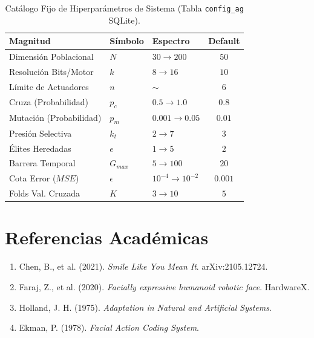 \documentclass[11pt, a4paper]{article}
\begin{document}
\begin{table}[H]
    \centering
    \caption{Catálogo Fijo de Hiperparámetros de Sistema (Tabla \texttt{config\_ag} SQLite).}
    \small
    \begin{tabular}{@{}lllc@{}}
        \toprule
        \textbf{Magnitud} & \textbf{Símbolo} & \textbf{Espectro} & \textbf{Default} \\
        \midrule
        Dimensión Poblacional & $N$ & $30 \to 200$ & $50$ \\
        Resolución Bits/Motor & $k$ & $8 \to 16$ & $10$ \\
        Límite de Actuadores & $n$ & $\sim$ & $6$ \\
        Cruza (Probabilidad) & $p_c$ & $0.5 \to 1.0$ & $0.8$ \\
        Mutación (Probabilidad)& $p_m$ & $0.001 \to 0.05$ & $0.01$ \\
        Presión Selectiva & $k_t$ & $2 \to 7$ & $3$ \\
        Élites Heredadas & $e$ & $1 \to 5$ & $2$ \\
        Barrera Temporal & $G_{max}$ & $5 \to 100$ & $20$ \\
        Cota Error ($MSE$) & $\epsilon$ & $10^{-4} \to 10^{-2}$ & $0.001$ \\
        Folds Val. Cruzada & $K$ & $3 \to 10$ & $5$ \\
        \bottomrule
    \end{tabular}
\end{table}


\section{Referencias Académicas}
\begin{enumerate} \small \itemsep-0.1em
    \item Chen, B., et al. (2021). \textit{Smile Like You Mean It}. arXiv:2105.12724.
    \item Faraj, Z., et al. (2020). \textit{Facially expressive humanoid robotic face}. HardwareX.
    \item Holland, J. H. (1975). \textit{Adaptation in Natural and Artificial Systems}.
    \item Ekman, P. (1978). \textit{Facial Action Coding System}.
\end{enumerate}
\end{document}
